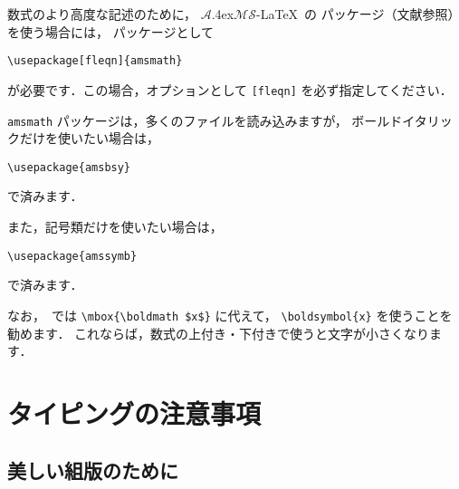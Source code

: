 \documentclass[technicalreport]{ieicej}
\newcommand{\AmSLaTeX}{%
 $\mathcal A$\lower.4ex\hbox{$\!\mathcal M\!$}$\mathcal S$-\LaTeX}
\begin{document}
数式のより高度な記述のために，\AmSLaTeX\ の
パッケージ（文献\cite{FMi1,otobe}参照）を使う場合には，
パッケージとして
\begin{verbatim}
\usepackage[fleqn]{amsmath}
\end{verbatim}
が必要です．この場合，オプションとして
\texttt{[fleqn]} を必ず指定してください．

\texttt{amsmath} パッケージは，多くのファイルを読み込みますが，
ボールドイタリックだけを使いたい場合は，
\begin{verbatim}
\usepackage{amsbsy}
\end{verbatim}
で済みます．

また，記号類だけを使いたい場合は，
\begin{verbatim}
\usepackage{amssymb}
\end{verbatim}
で済みます．

なお，\LaTeXe\ では \verb/\mbox{\boldmath $x$}/ に代えて，
\verb/\boldsymbol{x}/ を使うことを勧めます．
これならば，数式の上付き・下付きで使うと文字が小さくなります．

\section{タイピングの注意事項}
\label{sec:typesetting}

\subsection{美しい組版のために}
\label{sec:hyouki}
\end{document}
